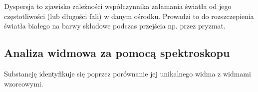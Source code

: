 \documentclass[a4paper,12pt]{article}
\begin{document}
Dyspersja to zjawisko zależności współczynnika załamania światła od jego częstotliwości (lub długości fali) w danym ośrodku. Prowadzi to do rozszczepienia światła białego na barwy składowe podczas przejścia np. przez pryzmat.~\cite{Drynski1976}


\subsection*{Analiza widmowa za pomocą spektroskopu}

Substancję identyfikuje się poprzez porównanie jej unikalnego widma z widmami wzorcowymi.










\end{document}

